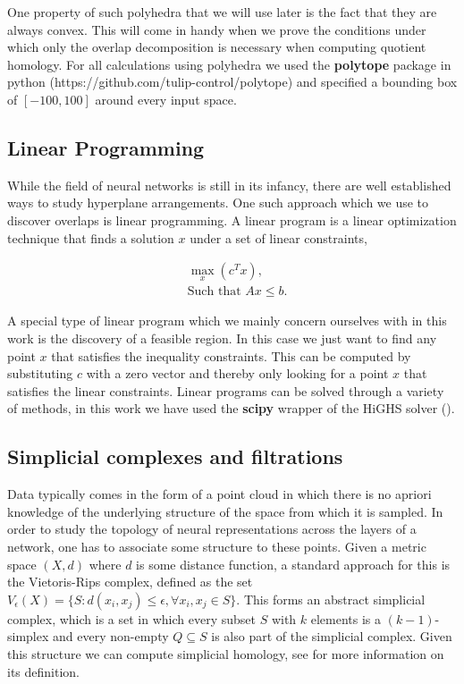 \documentclass[10pt]{article} %
\theoremstyle{plain}
\theoremstyle{definition}
\theoremstyle{remark}
\begin{document}
One property of such polyhedra that we will use later is the fact that they are always convex. This will come in handy when we prove the conditions under which only the overlap decomposition is necessary when computing quotient homology. For all calculations using polyhedra we used the \textbf{polytope} package in python (https://github.com/tulip-control/polytope) and specified a bounding box of $[-100,100]$ around every input space.

\subsection{Linear Programming}
While the field of neural networks is still in its infancy, there are well established ways to study hyperplane arrangements. One such approach which we use to discover overlaps is linear programming. A linear program is a linear optimization technique that finds a solution $x$ under a set of linear constraints,

\begin{align*}
    & \max\limits_{x}(c^Tx),\\
    & \text{Such that } Ax \leq b.
\end{align*}

A special type of linear program which we mainly concern ourselves with in this work is the discovery of a feasible region. In this case we just want to find any point $x$ that satisfies the inequality constraints. This can be computed by substituting $c$ with a zero vector and thereby only looking for a point $x$ that satisfies the linear constraints. Linear programs can be solved through a variety of methods, in this work we have used the \textbf{scipy} wrapper of the HiGHS solver (\cite{huangfu2018parallelizing}).

\subsection{Simplicial complexes and filtrations}
Data typically comes in the form of a point cloud in which there is no apriori knowledge of the underlying structure of the space from which it is sampled. In order to study the topology of neural representations across the layers of a network, one has to associate some structure to these points. Given a metric space $(X,d)$ {where $d$ is some distance function}, a standard approach for this is the Vietoris-Rips complex, defined as the set $V_\epsilon(X)  = \{S : d(x_i,x_j) \leq \epsilon, \forall x_i,x_j \in S\}$. This forms an abstract simplicial complex, {which is a set} in which every subset $S$ with $k$ elements is a $(k-1)$-simplex {and every non-empty $Q\subseteq S$ is also part of the simplicial complex}. Given this structure we can compute simplicial homology, {see \citet{hatcher2005algebraic} for more information on its definition}.
\end{document}
